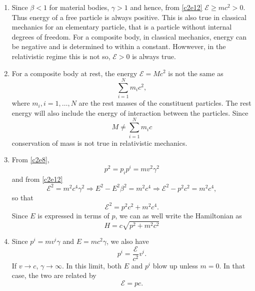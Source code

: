 \begin{enumerate}
\item Since $\beta < 1$ for material bodies, $\gamma > 1$ and hence, from 
\eqref{c2e12} $\mathcal{E} \ge mc^2 > 0$. Thus energy of a free particle is always positive.
This is also true in classical mechanics for an elementary particle, that is a
particle without internal degrees of freedom. For a composite body, in classical
mechanics, energy can be negative and is determined to within a constant. Howwever,
in the relativistic regime this is not so, $\mathcal{E} > 0$ is always true.

\item For a composite body at rest, the energy $\mathcal{E} = Mc^2$ is not the same as 
\[
\sum_{i=1}^N m_ic^2,
\]
where $m_i, i = 1, \ldots, N$ are the rest masses of the constituent particles.
The rest energy will also include the energy of interaction between the particles.
Since 
\[
M \ne \sum_{i=1}^N m_ic
\]
conservation of mass is not true in relativistic mechanics.

\item From \eqref{c2e8},
\[
p^2 = p_ip^i = mv^2\gamma^2
\]
and from \eqref{c2e12}
\[
\mathcal{E}^2 = m^2c^4\gamma^2 \Rightarrow E^2 - E^2\beta^2 = m^2c^4 \Rightarrow 
\mathcal{E}^2 - p^2c^2  = m^2c^4,
\]
so that
\begin{equation}\label{c2e15}
\mathcal{E}^2 = p^2c^2 + m^2c^4.
\end{equation}
Since $E$ is expressed in terms of $p$, we can as well write the Hamiltonian as
\begin{equation}\label{c2e16}
H = c\sqrt{p^2 + m^2c^2}
\end{equation}

\item Since $p^i = mv^i\gamma$ and $E = mc^2\gamma$, we also have
\begin{equation}\label{c2e17}
p^i = \frac{\mathcal{E}}{c^2}v^i.
\end{equation}
If $v \rightarrow c$, $\gamma \rightarrow \infty$. In this limit, both $E$ and
$p^i$ blow up unless $m = 0$. In that case, the two are related by
\begin{equation}\label{c2e18}
\mathcal{E} = pc.
\end{equation}


\end{enumerate}
